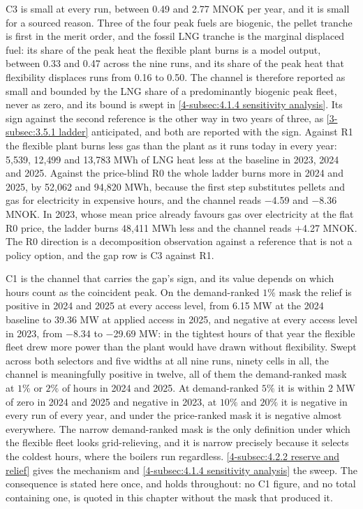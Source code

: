 C3 is small at every run, between 0.49 and 2.77 MNOK per year, and it is small for a sourced reason. Three of the four peak fuels are biogenic, the pellet tranche is first in the merit order, and the fossil LNG tranche is the marginal displaced fuel: its share of the peak heat the flexible plant burns is a model output, between 0.33 and 0.47 across the nine runs, and its share of the peak heat that flexibility displaces runs from 0.16 to 0.50. The channel is therefore reported as small and bounded by the LNG share of a predominantly biogenic peak fleet, never as zero, and its bound is swept in \autoref{4-subsec:4.1.4 sensitivity analysis}. Its sign against the second reference is the other way in two years of three, as \autoref{3-subsec:3.5.1 ladder} anticipated, and both are reported with the sign. Against R1 the flexible plant burns less gas than the plant as it runs today in every year: 5{,}539, 12{,}499 and 13{,}783 MWh of LNG heat less at the baseline in 2023, 2024 and 2025. Against the price-blind R0 the whole ladder burns more in 2024 and 2025, by 52{,}062 and 94{,}820 MWh, because the first step substitutes pellets and gas for electricity in expensive hours, and the channel reads $-$4.59 and $-$8.36 MNOK. In 2023, whose mean price already favours gas over electricity at the flat R0 price, the ladder burns 48{,}411 MWh less and the channel reads $+$4.27 MNOK. The R0 direction is a decomposition observation against a reference that is not a policy option, and the gap row is C3 against R1.

C1 is the channel that carries the gap's sign, and its value depends on which hours count as the coincident peak. On the demand-ranked $1\%$ mask the relief is positive in 2024 and 2025 at every access level, from 6.15 MW at the 2024 baseline to 39.36 MW at applied access in 2025, and negative at every access level in 2023, from $-$8.34 to $-$29.69 MW: in the tightest hours of that year the flexible fleet drew more power than the plant would have drawn without flexibility. Swept across both selectors and five widths at all nine runs, ninety cells in all, the channel is meaningfully positive in twelve, all of them the demand-ranked mask at $1\%$ or $2\%$ of hours in 2024 and 2025. At demand-ranked $5\%$ it is within 2 MW of zero in 2024 and 2025 and negative in 2023, at $10\%$ and $20\%$ it is negative in every run of every year, and under the price-ranked mask it is negative almost everywhere. The narrow demand-ranked mask is the only definition under which the flexible fleet looks grid-relieving, and it is narrow precisely because it selects the coldest hours, where the boilers run regardless. \autoref{4-subsec:4.2.2 reserve and relief} gives the mechanism and \autoref{4-subsec:4.1.4 sensitivity analysis} the sweep. The consequence is stated here once, and holds throughout: no C1 figure, and no total containing one, is quoted in this chapter without the mask that produced it.

